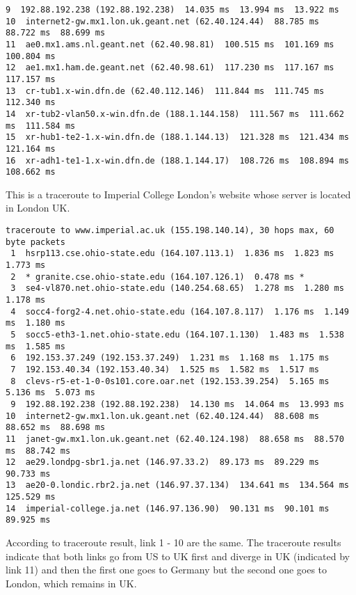 \documentclass[12pt]{article}
\begin{document}
\begin{singlespace}
\begin{enumerate}
\begin{itemize}
\begin{lstlisting}[basicstyle=\ttfamily\scriptsize]
 9  192.88.192.238 (192.88.192.238)  14.035 ms  13.994 ms  13.922 ms
10  internet2-gw.mx1.lon.uk.geant.net (62.40.124.44)  88.785 ms  88.722 ms  88.699 ms
11  ae0.mx1.ams.nl.geant.net (62.40.98.81)  100.515 ms  101.169 ms  100.804 ms
12  ae1.mx1.ham.de.geant.net (62.40.98.61)  117.230 ms  117.167 ms  117.157 ms
13  cr-tub1.x-win.dfn.de (62.40.112.146)  111.844 ms  111.745 ms  112.340 ms
14  xr-tub2-vlan50.x-win.dfn.de (188.1.144.158)  111.567 ms  111.662 ms  111.584 ms
15  xr-hub1-te2-1.x-win.dfn.de (188.1.144.13)  121.328 ms  121.434 ms  121.164 ms
16  xr-adh1-te1-1.x-win.dfn.de (188.1.144.17)  108.726 ms  108.894 ms  108.662 ms
		\end{lstlisting}
	This is a traceroute to Imperial College London's website whose server is located in London UK.
		\begin{lstlisting}[basicstyle=\ttfamily\scriptsize]
% traceroute www.imperial.ac.uk
traceroute to www.imperial.ac.uk (155.198.140.14), 30 hops max, 60 byte packets
 1  hsrp113.cse.ohio-state.edu (164.107.113.1)  1.836 ms  1.823 ms  1.773 ms
 2  * granite.cse.ohio-state.edu (164.107.126.1)  0.478 ms *
 3  se4-vl870.net.ohio-state.edu (140.254.68.65)  1.278 ms  1.280 ms  1.178 ms
 4  socc4-forg2-4.net.ohio-state.edu (164.107.8.117)  1.176 ms  1.149 ms  1.180 ms
 5  socc5-eth3-1.net.ohio-state.edu (164.107.1.130)  1.483 ms  1.538 ms  1.585 ms
 6  192.153.37.249 (192.153.37.249)  1.231 ms  1.168 ms  1.175 ms
 7  192.153.40.34 (192.153.40.34)  1.525 ms  1.582 ms  1.517 ms
 8  clevs-r5-et-1-0-0s101.core.oar.net (192.153.39.254)  5.165 ms  5.136 ms  5.073 ms
 9  192.88.192.238 (192.88.192.238)  14.130 ms  14.064 ms  13.993 ms
10  internet2-gw.mx1.lon.uk.geant.net (62.40.124.44)  88.608 ms  88.652 ms  88.698 ms
11  janet-gw.mx1.lon.uk.geant.net (62.40.124.198)  88.658 ms  88.570 ms  88.742 ms
12  ae29.londpg-sbr1.ja.net (146.97.33.2)  89.173 ms  89.229 ms  90.733 ms
13  ae20-0.londic.rbr2.ja.net (146.97.37.134)  134.641 ms  134.564 ms  125.529 ms
14  imperial-college.ja.net (146.97.136.90)  90.131 ms  90.101 ms  89.925 ms
		\end{lstlisting}
	According to traceroute result, link 1 - 10 are the same. The traceroute results indicate that both links go from US to UK first and diverge in UK (indicated by link 11) and then the first one goes to Germany but the second one goes to London, which remains in UK.
	\end{itemize}
\end{enumerate}
\end{singlespace}

\clearpage

\printbibliography
\end{document}
